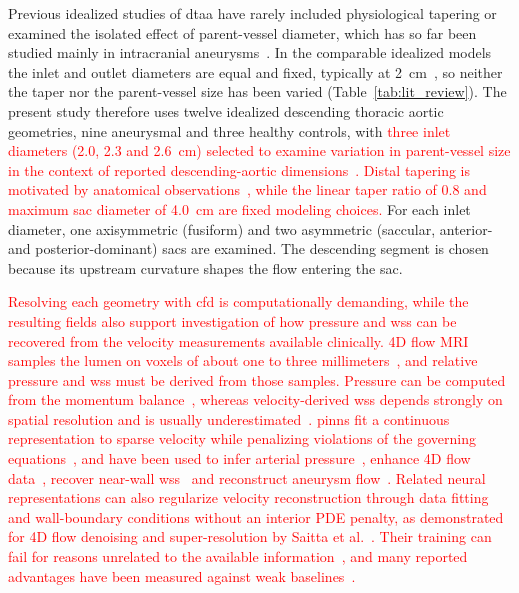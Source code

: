 \documentclass[12pt,a4paper]{article}
\newcommand{\CFD}{\ac{cfd}\xspace}
\newcommand{\DTAA}{\ac{dtaa}\xspace}
\newcommand{\WSS}{\ac{wss}\xspace}
\newcommand{\PINNscap}{\Acp{pinn}\xspace}
\theoremstyle{definition}
\numberwithin{equation}{section}
\newcommand{\revision}[1]{\textcolor{red}{#1}}
\begin{document}
Previous idealized studies of \DTAA have rarely included physiological tapering or examined the isolated effect of parent-vessel diameter, which has so far been studied mainly in intracranial aneurysms~\cite{fattahi2023influence}. In the comparable idealized models the inlet and outlet diameters are equal and fixed, typically at 2~cm~\cite{rehman2024comparative,rehman2025application}, so neither the taper nor the parent-vessel size has been varied (Table~\ref{tab:lit_review}). The present study therefore uses twelve idealized descending thoracic aortic geometries, nine aneurysmal and three healthy controls, with \revision{three inlet diameters (2.0, 2.3 and 2.6~cm) selected to examine variation in parent-vessel size in the context of reported descending-aortic dimensions~\cite{hager2002diameters}. Distal tapering is motivated by anatomical observations~\cite{lu2019consistency}, while the linear taper ratio of 0.8 and maximum sac diameter of 4.0~cm are fixed modeling choices.} For each inlet diameter, one axisymmetric (fusiform) and two asymmetric (saccular, anterior- and posterior-dominant) sacs are examined. The descending segment is chosen because its upstream curvature shapes the flow entering the sac.

\revision{Resolving each geometry with \CFD is computationally demanding, while the resulting fields also support investigation of how pressure and \WSS can be recovered from the velocity measurements available clinically. 4D flow MRI samples the lumen on voxels of about one to three millimeters~\cite{markl2012fourd}, and relative pressure and \WSS must be derived from those samples. Pressure can be computed from the momentum balance~\cite{krittian2012finite, bertoglio2018relative}, whereas velocity-derived \WSS depends strongly on spatial resolution and is usually underestimated~\cite{stalder2008quantitative, petersson2012assessment, potters2015volumetric}. \PINNscap fit a continuous representation to sparse velocity while penalizing violations of the governing equations~\cite{raissi2019pinn, raissi2020hfm}, and have been used to infer arterial pressure~\cite{kissas2020machine}, enhance 4D flow data~\cite{fathi2020super}, recover near-wall \WSS~\cite{arzani2021nearwall} and reconstruct aneurysm flow~\cite{cruzgonzalez2025aaa}. Related neural representations can also regularize velocity reconstruction through data fitting and wall-boundary conditions without an interior PDE penalty, as demonstrated for 4D flow denoising and super-resolution by Saitta et al.~\cite{saitta2024implicit}. Their training can fail for reasons unrelated to the available information~\cite{krishnapriyan2021failure, wang2021gradient}, and many reported advantages have been measured against weak baselines~\cite{mcgreivy2024weak}.}
\end{document}
